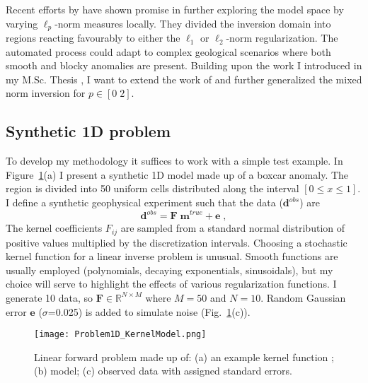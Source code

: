 Recent efforts by \cite{SunLi14} have shown promise in further exploring the model space by varying $\ell_p$-norm measures locally. They divided the inversion domain into regions reacting favourably to either the $\ell_1$ or $\ell_2$-norm regularization. The automated process could adapt to complex geological scenarios where both smooth and blocky anomalies are present.
Building upon the work I introduced in my M.Sc. Thesis \cite[]{Fournier2015}, I want to extend the work of \cite{SunLi14} and further generalized the mixed norm inversion for $p \in [0\;2]$.

\subsection{Synthetic 1D problem}
To develop my methodology it suffices to work with a simple test example.
In Figure~\ref{Problem1D}(a) I present a synthetic 1D model made up of a boxcar anomaly. The region is divided into 50 uniform cells distributed along the interval $[0 \le x \le 1]$. I define a synthetic geophysical experiment such that the data ($\mathbf{d}^{obs}$) are
\begin{equation}\label{Forward_Noisy}
\mathbf{d}^{obs} = \mathbf{F\;m}^{true} + \mathbf{e} \;,
\end{equation}
The kernel coefficients ${F}_{ij}$ are sampled from a standard normal distribution of positive values multiplied by the discretization intervals. Choosing a stochastic kernel function for a linear inverse problem is unusual. Smooth functions are usually employed (polynomials, decaying exponentials, sinusoidals), but my choice will serve to highlight the effects of various regularization functions. I generate 10 data, so $\mathbf{F}\in \mathbb{R}^{N \times M}$ where $M=50$ and $N=10$. Random Gaussian error $\mathbf{e}$ ($\sigma$=0.025) is added to simulate noise (Fig.~\ref{Problem1D}(c)).
\begin{figure}
\texttt{[image: Problem1D\_KernelModel.png]}
\caption{Linear forward problem made up of: (a) an example kernel function ; (b) model; (c) observed data with assigned standard errors.}
\label{Problem1D}
\end{figure}


